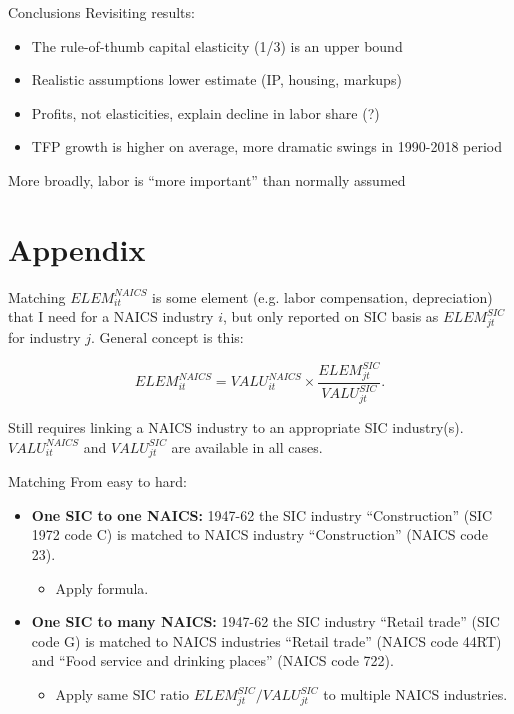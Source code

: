 \documentclass[10pt,xcolor=dvipsnames]{beamer}
\begin{document}
\begin{frame}{Conclusions}
Revisiting results:
\begin{itemize}
  \item The rule-of-thumb capital elasticity (1/3) is an upper bound
  \item Realistic assumptions lower estimate (IP, housing, markups)
  \item Profits, not elasticities, explain decline in labor share (?)
  \item TFP growth is higher on average, more dramatic swings in 1990-2018 period
\end{itemize}

\vspace{.25in}
More broadly, labor is ``more important'' than normally assumed
\end{frame}

\section{Appendix}

\begin{frame}{Matching}\label{Amatch}
$ELEM_{it}^{NAICS}$ is some element (e.g. labor compensation, depreciation) that I need for a NAICS industry $i$, but only reported on SIC basis as $ELEM_{jt}^{SIC}$ for industry $j$. General concept is this:

\begin{equation}
  ELEM_{it}^{NAICS} = VALU_{it}^{NAICS} \times \frac{ELEM_{jt}^{SIC}}{VALU_{jt}^{SIC}}. \label{EQ_match_app}
\end{equation}

Still requires linking a NAICS industry to an appropriate SIC industry(s). $VALU_{it}^{NAICS}$ and $VALU_{jt}^{SIC}$ are available in all cases.

\end{frame}

\begin{frame}{Matching}
From easy to hard:
\begin{itemize}
  \item \textbf{One SIC to one NAICS:} 1947-62 the SIC industry ``Construction'' (SIC 1972 code C) is matched to NAICS industry ``Construction'' (NAICS code 23). 
  \begin{itemize}
    \item Apply formula.
  \end{itemize}
  \item \textbf{One SIC to many NAICS:} 1947-62 the SIC industry ``Retail trade'' (SIC code G) is matched to NAICS industries ``Retail trade'' (NAICS code 44RT) and ``Food service and drinking places'' (NAICS code 722). 
  \begin{itemize}
    \item Apply same SIC ratio $ELEM_{jt}^{SIC}/VALU_{jt}^{SIC}$ to multiple NAICS industries. 
  \end{itemize}
\end{itemize}

\end{frame}
\end{document}
